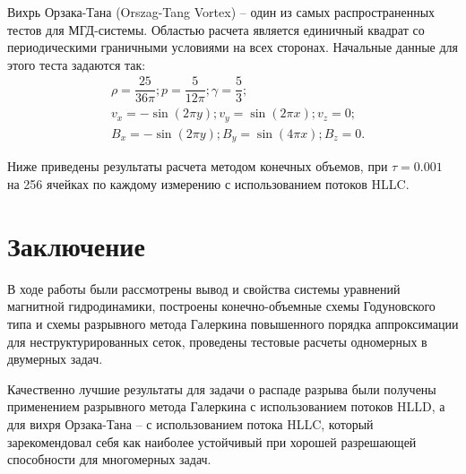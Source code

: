 \documentclass[14pt, a4paper, fleqn]{extreport}
\begin{document}
	Вихрь Орзака-Тана (Orszag-Tang Vortex) --
	один из самых распространенных тестов для МГД-системы.
	Областью расчета является единичный квадрат со периодическими 
	граничными условиями на всех сторонах.
	Начальные данные для этого теста задаются так:
	\begin{equation*}
	\begin{split}
		&\rho = \dfrac{25}{36\pi}; p = \dfrac{5}{12\pi}; \gamma = \dfrac{5}{3}; \\
		&v_x = -\sin(2\pi y); v_y = \sin(2\pi x); v_z = 0; \\
		&B_x = -\sin(2\pi y); B_y = \sin(4\pi x); B_z = 0.
	\end{split}
	\end{equation*}
	
	Ниже приведены результаты расчета методом конечных объемов,
	при $\tau = 0.001$ на 256 ячейках по каждому измерению с 
	использованием потоков HLLC.
	
	\chapter*{Заключение}
	
	В ходе работы были рассмотрены вывод и свойства системы уравнений магнитной 
	гидродинамики, построены конечно-объемные схемы Годуновского типа
	и схемы разрывного метода Галеркина повышенного порядка аппроксимации
	для неструктурированных сеток, проведены тестовые расчеты
	одномерных в двумерных задач.
	
	Качественно лучшие результаты для задачи о распаде разрыва
	были получены применением разрывного метода Галеркина 
	с использованием потоков HLLD,
	а для вихря Орзака-Тана -- с использованием потока HLLC, который
	зарекомендовал себя как наиболее устойчивый при хорошей 
	разрешающей способности для многомерных задач.
	
	
	
\end{document}
